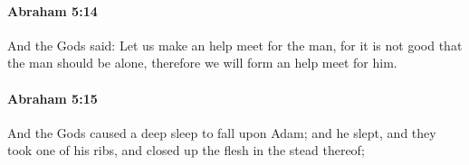 
		\paragraph{Abraham 5:14} %
			\label{ABRAHAM-5-14}

			And the Gods said: Let us make an help meet for the man, for it is not good that the man should be alone, therefore we will form an help meet for him.


		\paragraph{Abraham 5:15} %
			\label{ABRAHAM-5-15}

			And the Gods caused a deep sleep to fall upon Adam; and he slept, and they took one of his ribs, and closed up the flesh in the stead thereof;


